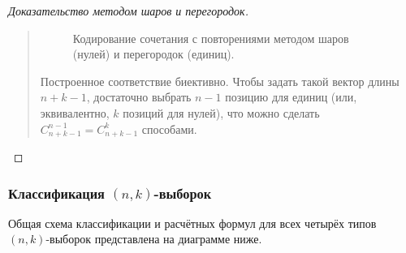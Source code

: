 \begin{proof}[Доказательство методом шаров и перегородок]
\begin{quote}
\begin{figure}[H]
            \caption{Кодирование сочетания с повторениями методом шаров 
            (нулей) и перегородок (единиц).}
        \end{figure}

        Построенное соответствие биективно. Чтобы задать такой вектор длины 
        $n + k - 1$, достаточно выбрать $n - 1$ позицию для единиц (или, 
        эквивалентно, $k$ позиций для нулей), что можно сделать 
        $C_{n+k-1}^{n-1} = C_{n+k-1}^k$ способами.
    \end{quote}
\end{proof}

\subsubsection{Классификация $(n, k)$-выборок}

Общая схема классификации и расчётных формул для всех четырёх типов 
$(n, k)$-выборок представлена на диаграмме ниже.

